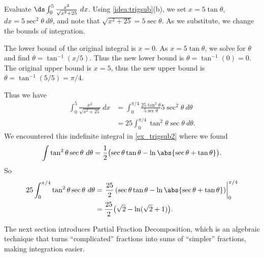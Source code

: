 \begin{example}\label{ex_trigsub6}
Evaluate $\ds\int_0^5\frac{x^2}{\sqrt{x^2+25}}\ dx$.
\solution
Using \autoref{idea:trigsub}(b), we set $x=5\tan\theta$, $dx = 5\sec^2\theta\ d\theta$, and note that $\sqrt{x^2+25} = 5\sec\theta$. As we substitute, we change the bounds of integration.

The lower bound of the original integral is $x=0$. As $x=5\tan\theta$, we solve for $\theta$ and find $\theta = \tan^{-1}(x/5)$. Thus the new lower bound is $\theta = \tan^{-1}(0) = 0$. The original upper bound is $x=5$, thus the new upper bound is $\theta = \tan^{-1}(5/5) = \pi/4$. 

Thus we have 
\begin{align*}
\int_0^5\frac{x^2}{\sqrt{x^2+25}}\ dx &= \int_0^{\pi/4} \frac{25\tan^2\theta}{5\sec\theta}5\sec^2\theta\ d\theta\\
		&= 25\int_0^{\pi/4} \tan^2\theta\sec\theta\ d\theta.
\end{align*}
We encountered this indefinite integral in \autoref{ex_trigsub2} where we found 
\[\int \tan^2\theta\sec\theta \ d\theta = \frac12\bigl(\sec\theta\tan\theta-\ln\abs{\sec\theta+\tan\theta}\bigr).\]
So
\begin{align*}
	25\int_0^{\pi/4} \tan^2\theta\sec\theta\ d\theta
	&= \left.\frac{25}2\left(\sec\theta\tan\theta-\ln\abs{\sec\theta+\tan\theta}\right)\right|_0^{\pi/4}\\
	&= \frac{25}2\bigl(\sqrt2-\ln(\sqrt2+1)\bigr)
	.
\end{align*}
\end{example}

%

The next section introduces Partial Fraction Decomposition, which is an algebraic technique that turns ``complicated'' fractions into sums of ``simpler'' fractions, making integration easier.

